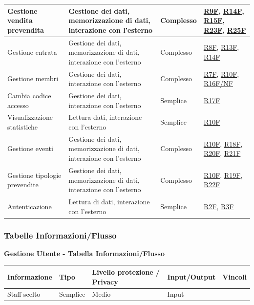 \documentclass[a4paper]{article}
\begin{document}
\begin{center}
\begin{tabularx}{1\textwidth}{|X|X|X|X|}
        Gestione vendita prevendita & Gestione dei dati, memorizzazione di dati, interazione con l'esterno & Complesso & \hyperlink{R9F}{R9F}, \hyperlink{R14F}{R14F}, \hyperlink{R15F}{R15F}, \hyperlink{R23F}{R23F}, \hyperlink{R25F}{R25F} \\
        \hline
        Gestione entrata & Gestione dei dati, memorizzazione di dati, interazione con l'esterno & Complesso & \hyperlink{R8F}{R8F}, \hyperlink{R13F}{R13F}, \hyperlink{R14F}{R14F} \\
        \hline
        Gestione membri & Gestione dei dati, interazione con l'esterno & Complesso & \hyperlink{R7F}{R7F}, \hyperlink{R10F}{R10F}, \hyperlink{R16F/NF}{R16F/NF} \\
        \hline
        Cambia codice accesso & Gestione dei dati, interazione con l'esterno & Semplice & \hyperlink{R17F}{R17F}  \\
        \hline
        Visualizzazione statistiche & Lettura dati, interazione con l'esterno & Semplice & \hyperlink{R10F}{R10F}  \\
        \hline
        Gestione eventi & Gestione dei dati, memorizzazione di dati, interazione con l'esterno & Complesso & \hyperlink{R10F}{R10F}, \hyperlink{R18F}{R18F}, \hyperlink{R20F}{R20F}, \hyperlink{R21F}{R21F} \\
        \hline
        Gestione tipologie prevendite & Gestione dei dati, memorizzazione di dati, interazione con l'esterno & Complesso & \hyperlink{R10F}{R10F}, \hyperlink{R19F}{R19F}, \hyperlink{R22F}{R22F} \\
        \hline
        Autenticazione & Lettura di dati, interazione con l'esterno & Semplice & \hyperlink{R2F}{R2F}, \hyperlink{R3F}{R3F} \\
        \hline
    \end{tabularx}
\end{center}

\newpage

\subsubsection{Tabelle Informazioni/Flusso}

\textbf{Gestione Utente - Tabella Informazioni/Flusso}

\begin{center}
    \begin{tabularx}{1\textwidth}{|X|X|X|X|X|}
        \hline
        \textbf{Informazione} &\textbf{Tipo} & \textbf{Livello protezione / Privacy} & \textbf{Input/Output} & \textbf{Vincoli}\\
        \hline
        \hline
        \hline
        Staff scelto & Semplice & Medio & Input & \\
        \hline
    \end{tabularx}
\end{center}
\end{document}
